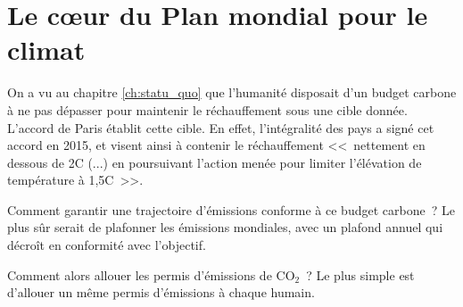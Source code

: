 \documentclass[a5paper,french]{memoir}
\begin{document}
\chapter{Le cœur du Plan mondial pour le climat\label{ch:coeur}}


On a vu au chapitre \ref{ch:statu_quo} que l'humanité disposait d'un budget carbone à ne pas dépasser pour maintenir le réchauffement sous une cible donnée. L'accord de Paris établit cette cible. En effet, l'intégralité des pays a signé cet accord en 2015, et visent ainsi à contenir le réchauffement <<~nettement en dessous de 2\textdegree{}C (...) en poursuivant l'action menée pour limiter l'élévation de température à 1,5\textdegree{}C~>>. 

Comment garantir une trajectoire d'émissions conforme à ce budget carbone~? Le plus sûr serait de plafonner les émissions mondiales, avec un plafond annuel qui décroît en conformité avec l'objectif. 

Comment alors allouer les permis d'émissions de CO$_\text{2}$~? Le plus simple %
est d'allouer un même permis d'émissions à chaque humain. 
\end{document}
